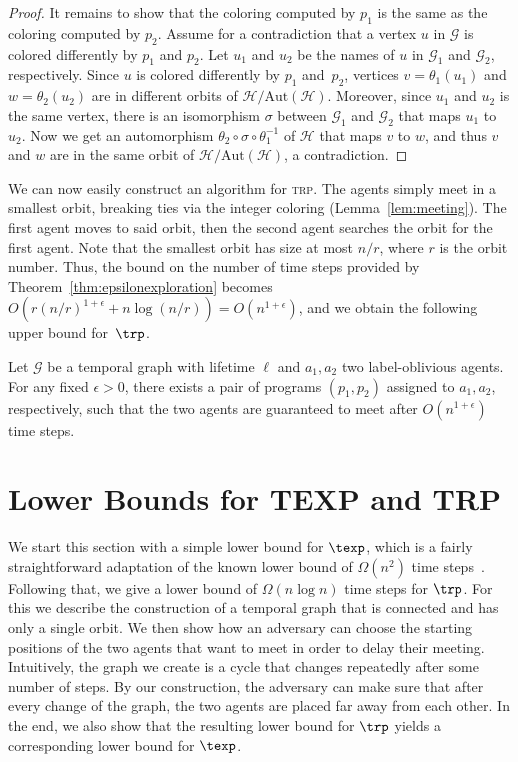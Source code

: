 {\begin{proof}
It remains to show that the coloring computed by $p_1$ is the same as the
coloring computed by $p_2$. Assume for a contradiction that a vertex $u$ in
$\mathcal{G}$ is colored differently by $p_1$ and $p_2$. Let $u_1$ and $u_2$ be
the names of $u$ in $\mathcal{G}_1$ and $\mathcal{G}_2$, respectively. Since $u$
is colored differently by $p_1$ and~$p_2$, vertices $v=\theta_1(u_1)$ and
$w=\theta_2(u_2)$ are in different orbits of
$\mathcal{H}/\text{Aut}(\mathcal{H})$. Moreover, since $u_1$ and $u_2$ is the
same vertex, there is an isomorphism $\sigma$ between $\mathcal{G}_1$ and
$\mathcal{G}_2$ that maps $u_1$ to $u_2$. Now we get an automorphism
$\theta_2\circ \sigma \circ \theta_1^{-1}$ of $\mathcal{H}$ that maps $v$ to
$w$, and thus $v$ and $w$ are in the same orbit of
$\mathcal{H}/\text{Aut}(\mathcal{H})$, a contradiction. 
\end{proof}
}
\full{\proofmeeting}
We can now easily construct an algorithm for \textsc{trp}.  The agents
simply meet in a smallest orbit, breaking ties via the integer coloring
(Lemma~\ref{lem:meeting}). The first agent moves to said orbit,
then the
second agent searches the orbit for the first agent. Note that the smallest
orbit has size at most $n/r$, where $r$ is the orbit number. Thus, the bound
on the number of time steps provided by Theorem~\ref{thm:epsilonexploration}
becomes $O(r(n/r)^{1+\epsilon}+n\log (n/r))= O(n^{1+\epsilon})$, and we obtain
the following upper bound for~$\trp$.

\begin{theorem}\label{thm:rendezvous-time} Let $\mathcal{G}$ be a temporal graph
    with lifetime $\ell$ and $a_1, a_2$ two label-oblivious agents. For any
    fixed $\epsilon > 0$, there exists a pair of programs $(p_1, p_2)$ assigned
    to $a_1, a_2$, respectively, such that the two agents are guaranteed to meet
    after $O(n^{1+\epsilon})$ time steps.
\end{theorem}

\section{Lower Bounds for TEXP and TRP}
\label{sec:lower-bounds}

We start this section with a simple lower bound for $\texp$, which is a
{fairly straightforward adaptation}
of the known lower bound of $\Omega(n^2)$ time steps~\cite{ErlebachHK21}.
Following that, we give a lower bound of $\Omega(n \log n)$ time steps for
$\trp$. For this we describe the construction of a temporal graph that is
connected and has only a single orbit. We then show how an adversary can choose
the starting positions of the two agents that want to meet in order to delay
their meeting. Intuitively, the graph we create is a cycle that changes
repeatedly after some number of steps. By our construction, the adversary can
make sure that after every change of the graph, the two agents are placed far
away from each other. In the end, we also show that the resulting lower bound
for $\trp$ yields a corresponding lower bound for $\texp$.

